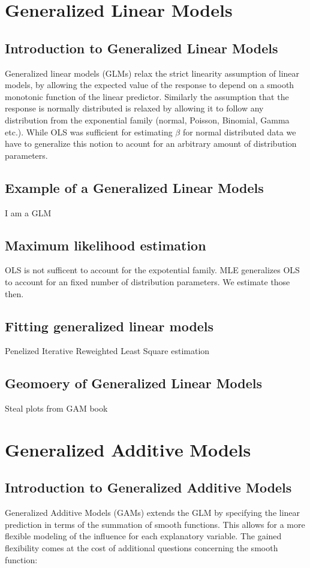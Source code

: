 \documentclass{article}
\begin{document}
    \section{Generalized Linear Models}
    \subsection{Introduction to Generalized Linear Models}
    Generalized linear models (GLMs) relax the strict linearity assumption of linear models, by allowing the expected value of the response to depend on a smooth monotonic function of the linear predictor. Similarly the assumption that the response is normally distributed is relaxed by allowing it to follow any distribution from the exponential family (normal, Poisson, Binomial, Gamma etc.). While OLS was sufficient for estimating $\beta$ for normal distributed data we have to generalize this notion to acount for an arbitrary amount of distribution parameters.
    \subsection{Example of a Generalized Linear Models}
    I am a GLM
    \subsection{Maximum likelihood estimation}
    OLS is not sufficent to account for the expotential family. MLE generalizes OLS to account for an fixed number of distribution parameters. We estimate those then.
    \subsection{Fitting generalized linear models}
    Penelized Iterative Reweighted Least Square estimation
    \subsection{Geomoery of Generalized Linear Models}
    Steal plots from GAM book

    \section{Generalized Additive Models}
    \subsection{Introduction to Generalized Additive Models}
    Generalized Additive Models (GAMs) extends the GLM by specifying the linear prediction in terms of the summation of smooth functions. This allows for a more flexible modeling of the influence for each explanatory variable. The gained flexibility comes at the cost of additional questions concerning the smooth function:
\end{document}
